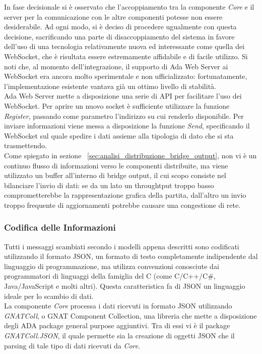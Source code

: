 In fase decisionale si è osservato che l'accoppiamento tra la componente \emph{Core} e il server per la comunicazione con le altre componenti potesse non essere desiderabile. Ad ogni modo, si è deciso di procedere ugualmente con questa decisione, sacrificando una parte di disaccoppiamento del sistema in favore dell'uso di una tecnologia relativamente nuova ed interessante come quella dei WebSocket, che è risultata essere estremamente affidabile e di facile utilizzo. Si noti che, al momento dell'integrazione, il supporto di Ada Web Server ai WebSocket era ancora molto sperimentale e non ufficializzato: fortunatamente, l'implementazione esistente vantava già un ottimo livello di stabilità.\\

Ada Web Server mette a disposizione una serie di API per facilitare l'uso dei WebSocket. Per aprire un nuovo socket è sufficiente utilizzare la funzione \emph{Register}, passando come parametro l'indirizzo su cui renderlo disponibile. Per inviare informazioni viene messa a disposizione la funzione \emph{Send}, specificando il WebSocket sul quale spedire i dati assieme alla tipologia di dato che si sta trasmettendo.\\

Come spiegato in sezione ~\ref{sec:analisi_distribuzione_bridge_output}, non vi è un continuo flusso di informazioni verso le componenti distribuite, ma viene utilizzato un buffer all'interno di bridge output, il cui scopo consiste nel bilanciare l'invio di dati: se da un lato un throughtput troppo basso comprometterebbe la rappresentazione grafica della partita, dall'altro un invio troppo frequente di aggiornamenti potrebbe causare una congestione di rete.

\subsubsection{Codifica delle Informazioni}

Tutti i messaggi scambiati secondo i modelli appena descritti sono codificati utilizzando il formato JSON, un formato di testo completamente indipendente dal linguaggio di programmazione, ma utilizza convenzioni conosciute dai programmatori di linguaggi della famiglia del C (come C/C++/C\#, Java/JavaScript e molti altri). Questa caratteristica fa di JSON un linguaggio ideale per lo scambio di dati.\\

La componente \emph{Core} processa i dati ricevuti in formato JSON utilizzando \emph{GNATColl}, o GNAT Component Collection, una libreria che mette a disposizione degli ADA package general purpose aggiuntivi. Tra di essi vi è il package \emph{GNATColl.JSON}, il quale permette sia la creazione di oggetti JSON che il parsing di tale tipo di dati ricevuti da \emph{Core}.\\

